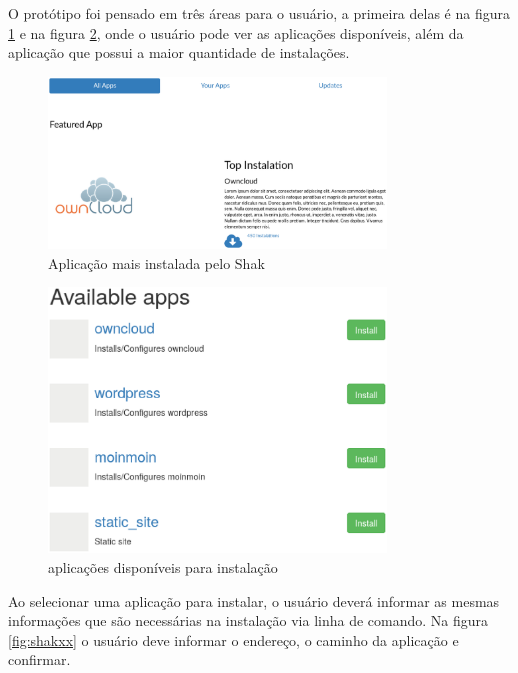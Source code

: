 O protótipo foi pensado em três áreas para o usuário, a primeira delas é na figura
\ref{fig:shakx1} e na figura \ref{fig:shakx1.2}, onde
o usuário pode ver as aplicações disponíveis, além da aplicação que possui a maior
quantidade de instalações.

\begin{figure}[H]
  \centering
  \includegraphics[width=0.8\textwidth]
      {figuras/shak1}
      \caption{Aplicação mais instalada pelo Shak}
  \label{fig:shakx1}
\end{figure}

\begin{figure}[H]
  \centering
  \includegraphics[width=0.8\textwidth]
      {figuras/shak1-2}
      \caption{aplicações disponíveis para instalação}
  \label{fig:shakx1.2}
\end{figure}

Ao selecionar uma aplicação para instalar, o usuário deverá informar as mesmas
informações que são necessárias na instalação via linha de comando. Na figura \ref{fig:shakxx}
o usuário deve informar o endereço, o caminho da aplicação e confirmar.

